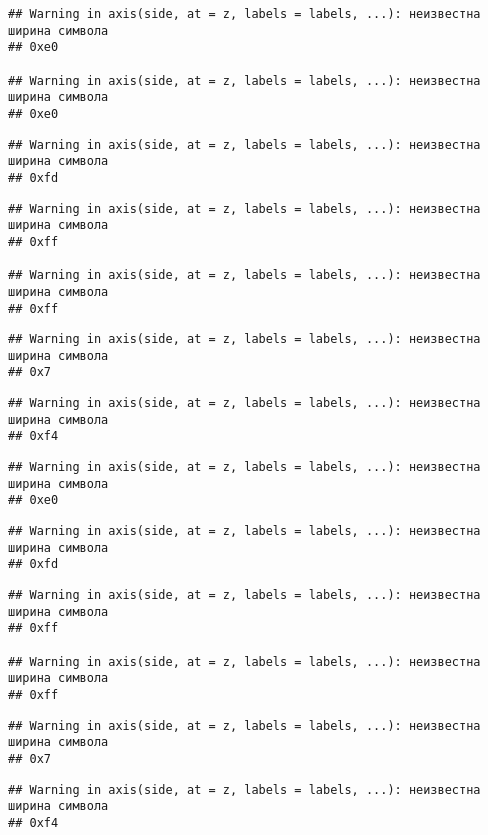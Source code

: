 \documentclass[
]{article}
\begin{document}
\begin{verbatim}
## Warning in axis(side, at = z, labels = labels, ...): неизвестна ширина символа
## 0xe0

## Warning in axis(side, at = z, labels = labels, ...): неизвестна ширина символа
## 0xe0
\end{verbatim}

\begin{verbatim}
## Warning in axis(side, at = z, labels = labels, ...): неизвестна ширина символа
## 0xfd
\end{verbatim}

\begin{verbatim}
## Warning in axis(side, at = z, labels = labels, ...): неизвестна ширина символа
## 0xff

## Warning in axis(side, at = z, labels = labels, ...): неизвестна ширина символа
## 0xff
\end{verbatim}

\begin{verbatim}
## Warning in axis(side, at = z, labels = labels, ...): неизвестна ширина символа
## 0x7
\end{verbatim}

\begin{verbatim}
## Warning in axis(side, at = z, labels = labels, ...): неизвестна ширина символа
## 0xf4
\end{verbatim}

\begin{verbatim}
## Warning in axis(side, at = z, labels = labels, ...): неизвестна ширина символа
## 0xe0
\end{verbatim}

\begin{verbatim}
## Warning in axis(side, at = z, labels = labels, ...): неизвестна ширина символа
## 0xfd
\end{verbatim}

\begin{verbatim}
## Warning in axis(side, at = z, labels = labels, ...): неизвестна ширина символа
## 0xff

## Warning in axis(side, at = z, labels = labels, ...): неизвестна ширина символа
## 0xff
\end{verbatim}

\begin{verbatim}
## Warning in axis(side, at = z, labels = labels, ...): неизвестна ширина символа
## 0x7
\end{verbatim}

\begin{verbatim}
## Warning in axis(side, at = z, labels = labels, ...): неизвестна ширина символа
## 0xf4
\end{verbatim}
\end{document}
